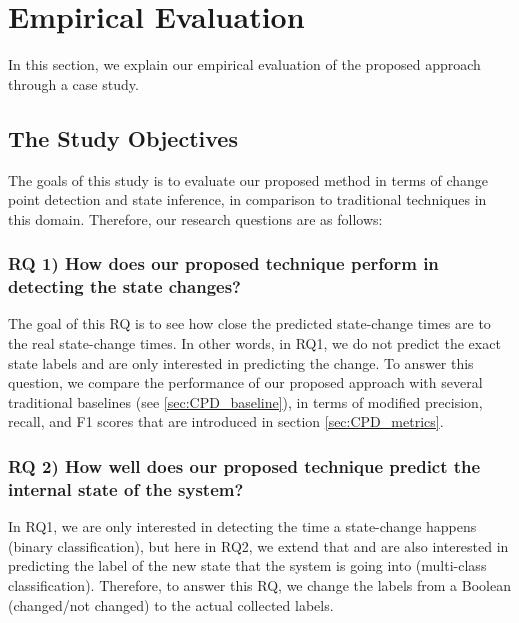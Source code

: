 \section{Empirical Evaluation} \label{sec:experiment}
In this section, we explain our empirical evaluation of the proposed approach through a case study.

\subsection{The Study Objectives}
The goals of this study is to evaluate our proposed method in terms of change point detection and state inference, in comparison to traditional techniques in this domain.  Therefore, our research questions are as follows:

\subsubsection{RQ 1) How does our proposed technique perform in detecting the state changes?}
The goal of this RQ is to see how close the predicted state-change times are to the real state-change times.  In other words, in RQ1, we do not predict the exact state labels and are only interested in predicting the change.
To answer this question, we compare the performance of our proposed approach with several traditional baselines (see \ref{sec:CPD_baseline}), in terms of modified precision, recall, and F1 scores that are introduced in section \ref{sec:CPD_metrics}.


\subsubsection{RQ 2) How well does our proposed technique predict the internal state of the system?}
In RQ1, we are only interested in detecting the time a state-change happens (binary classification), but here in RQ2, we extend that and are also interested in predicting the label of the new state that the system is going into (multi-class classification).  
Therefore, to answer this RQ, we change the labels from a Boolean (changed/not changed) to the actual collected labels. 


